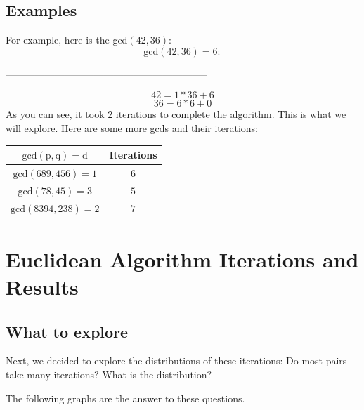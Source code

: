 \documentclass[8pt]{beamer}
\begin{document}
\subsection{Examples}
\begin{frame}
For example, here is the gcd$(42,36)$:
		$$\mathrm{gcd}(42,36) = 6:$$

\begin{center}--------------------------------------------------------------
\end{center}	
	\begin{equation}
		42 = 1 * 36 + 6
	\end{equation}
	\begin{equation}
		36 = 6 * 6 + 0
	\end{equation}
As you can see, it took $2$ iterations to complete the algorithm. This is what we will explore. Here are some more gcds and their iterations:

\begin{center}
\begin{tabular}{c|c}

$\mathrm{gcd}(\mathrm{p},\mathrm{q}) = \mathrm{d}$ & Iterations
\\
\hline
$\mathrm{gcd}(689,456) = 1$ & $6$\\

$\mathrm{gcd}(78,45) = 3$ & $5$\\

$\mathrm{gcd}(8394,238) = 2$ & $7$\\


\end{tabular}
\end{center}
\end{frame}

\section{Euclidean Algorithm Iterations and Results}

\subsection{What to explore}
\begin{frame}
Next, we decided to explore the distributions of these iterations:
Do most pairs take many iterations? What is the distribution?

The following graphs are the answer to these questions.


\end{frame}
\end{document}
